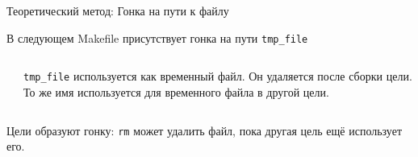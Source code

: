     \begin{frame}{Теоретический метод: Гонка на пути к файлу}

        В следующем Makefile присутствует гонка на пути \texttt{tmp\_file}

        \begin{columns}[t]
            \begin{column}{.45 \textwidth}
                \newline
                
            \end{column}
            \begin{column}{.4 \textwidth}
                \newline \newline \newline \newline
                \texttt{tmp\_file} используется как временный файл.
                \newline
                Он удаляется после сборки цели.
                \newline \newline \newline
                То же имя используется для
                \newline
                временного файла в другой
                \newline
                цели.
            \end{column}
        \end{columns}

        Цели образуют гонку: \texttt{rm} может удалить файл, пока другая цель ещё использует его.

    \end{frame}

